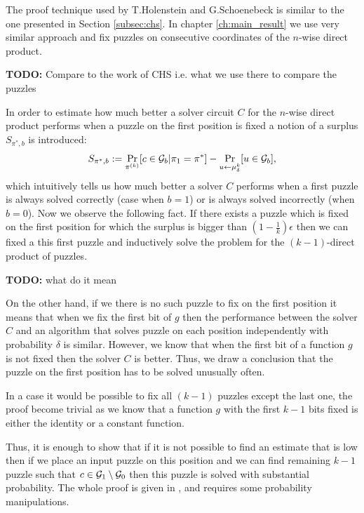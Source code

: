 The proof technique used by T.Holenstein and G.Schoenebeck is similar to the one presented in Section \ref{subsec:chs}.
In chapter \ref{ch:main_result} we use very similar approach and fix puzzles on consecutive coordinates of the $n$-wise direct product.

\begin{todo}
  \textbf{TODO:} Compare to the work of CHS i.e. what we use there to compare the puzzles
\end{todo}

In order to estimate how much better a solver circuit $C$ for the $n$-wise direct product performs when
a puzzle on the first position is fixed a notion of a surplus $S_{\pi^*, b}$ is introduced:
\begin{align*}
S_{\pi^*, b} := \Pr_{\pi^{(k)}} [ c \in \mathcal{G}_b | \pi_1 = \pi^* ] - \Pr_{u \leftarrow \mu_{\delta}^{k}} [u \in \mathcal{G}_b],
\end{align*}
which intuitively tells us how much better a solver $C$ performs when a first puzzle is always solved correctly (case when $b = 1$)
or is always solved incorrectly (when $b = 0$).
Now we observe the following fact. If there exists a puzzle which is fixed on the first position for which the surplus is bigger than
$(1 - \frac{1}{k})\epsilon$ then we can fixed a this first puzzle and inductively solve the problem for the $(k-1)$-direct product of puzzles.
\begin{todo}
  \textbf{TODO:} what do it mean
\end{todo}
On the other hand, if we there is no such puzzle to fix on the first position it means that when we fix the first bit of $g$ then
the performance between the solver $C$ and an algorithm that solves puzzle on each position independently with probability $\delta$
is similar. However, we know that when the first bit of a function $g$ is not fixed then the solver $C$ is better.
Thus, we draw a conclusion that the puzzle on the first position has to be solved unusually often.

In a case it would be possible to fix all $(k-1)$ puzzles except the last one, the proof become trivial as we know that a function
$g$ with the first $k-1$ bits fixed is either the identity or a constant function.

Thus, it is enough to show that if it is not possible to find an estimate that is low then
if we place an input puzzle on this position and we can find remaining $k-1$ puzzle such that
$c \in \mathcal{G}_1 \setminus \mathcal{G}_0$ then this puzzle is solved with substantial probability.
The whole proof is given in \cite{DBLP:journals/corr/abs-1002-3534}, and requires some probability manipulations.

